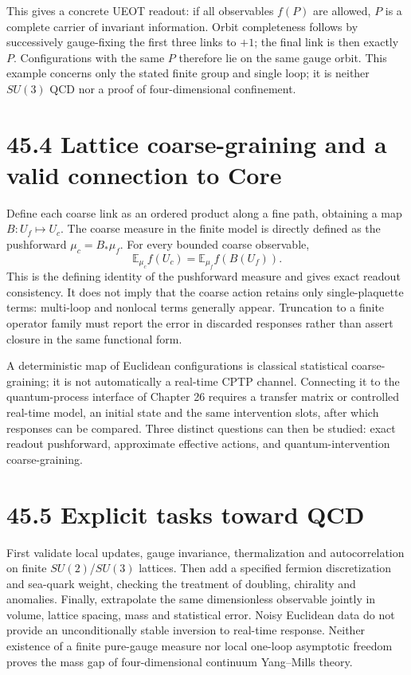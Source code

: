 \documentclass[
  11pt,
  oneside]{book}
\begin{document}
This gives a concrete UEOT readout: if all observables \(f(P)\) are
allowed, \(P\) is a complete carrier of invariant information. Orbit
completeness follows by successively gauge-fixing the first three links
to \(+1\); the final link is then exactly \(P\). Configurations with the
same \(P\) therefore lie on the same gauge orbit. This example concerns
only the stated finite group and single loop; it is neither \(SU(3)\)
QCD nor a proof of four-dimensional confinement.

\section{45.4 Lattice coarse-graining and a valid connection to Core}

Define each coarse link as an ordered product along a fine path,
obtaining a map \(B:U_f\mapsto U_c\). The coarse measure in the finite
model is directly defined as the pushforward \(\mu_c=B_*\mu_f\). For
every bounded coarse observable, \[
\mathbb E_{\mu_c}f(U_c)=\mathbb E_{\mu_f}f(B(U_f)).
\] This is the defining identity of the pushforward measure and gives
exact readout consistency. It does not imply that the coarse action
retains only single-plaquette terms: multi-loop and nonlocal terms
generally appear. Truncation to a finite operator family must report the
error in discarded responses rather than assert closure in the same
functional form.

A deterministic map of Euclidean configurations is classical statistical
coarse-graining; it is not automatically a real-time CPTP channel.
Connecting it to the quantum-process interface of Chapter 26 requires a
transfer matrix or controlled real-time model, an initial state and the
same intervention slots, after which responses can be compared. Three
distinct questions can then be studied: exact readout pushforward,
approximate effective actions, and quantum-intervention coarse-graining.

\section{45.5 Explicit tasks toward QCD}

First validate local updates, gauge invariance, thermalization and
autocorrelation on finite \(SU(2)\)/\(SU(3)\) lattices. Then add a
specified fermion discretization and sea-quark weight, checking the
treatment of doubling, chirality and anomalies. Finally, extrapolate the
same dimensionless observable jointly in volume, lattice spacing, mass
and statistical error. Noisy Euclidean data do not provide an
unconditionally stable inversion to real-time response. Neither
existence of a finite pure-gauge measure nor local one-loop asymptotic
freedom proves the mass gap of four-dimensional continuum Yang--Mills
theory.
\end{document}
